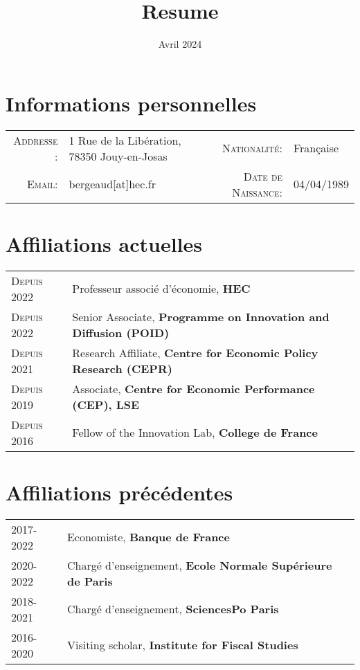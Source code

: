 \documentclass[12pt]{article}
\begin{document}
\title{\textbf{Resume}}
\date{Avril 2024}
\maketitle
\section*{Informations personnelles}

\begin{tabular}{r l r l }
    \textsc{Addresse :}   & 1 Rue de la Libération, 78350 Jouy-en-Josas  & \textsc{Nationalité:} & Française \\
    \textsc{Email:}     & bergeaud[at]hec.fr &     \textsc{Date de Naissance:} & 04/04/1989 \\ 
\end{tabular}

\section*{Affiliations actuelles}
\begin{tabular}{p{3cm}l}
\textsc{Depuis 2022} & Professeur associé d'économie, \textbf{HEC} \\
\textsc{Depuis 2022} & Senior Associate, \textbf{Programme on Innovation and Diffusion  (POID)} \\
\textsc{Depuis 2021} & Research Affiliate, \textbf{Centre for Economic Policy Research (CEPR)} \\
\textsc{Depuis 2019} & Associate, \textbf{Centre for Economic Performance (CEP), LSE} \\
\textsc{Depuis 2016} & Fellow of the Innovation Lab, \textbf{College de France} \\
\end{tabular}

\section*{Affiliations précédentes}

\begin{tabular}{p{3cm}l}
\textsc{2017-2022} & Economiste, \textbf{Banque de France} \\
\textsc{2020-2022} & Chargé d'enseignement, \textbf{Ecole Normale Supérieure de Paris} \\
\textsc{2018-2021} & Chargé d'enseignement, \textbf{SciencesPo Paris} \\
\textsc{2016-2020} & Visiting scholar, \textbf{Institute for Fiscal Studies}
\end{tabular}
\end{document}

